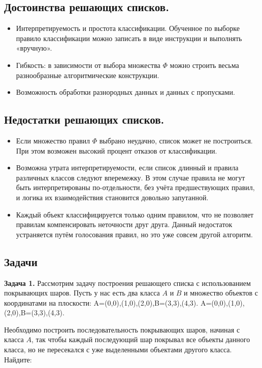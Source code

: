 \subsection*{Достоинства решающих списков.}

\begin{itemize} \item Интерпретируемость и простота классификации. Обученное по выборке правило классификации можно записать в виде инструкции и выполнять «вручную». \item Гибкость: в зависимости от выбора множества $\Phi$ можно строить весьма разнообразные алгоритмические конструкции. \item Возможность обработки разнородных данных и данных с пропусками. \end{itemize}

\subsection*{Недостатки решающих списков.}

\begin{itemize} \item Если множество правил $\Phi$ выбрано неудачно, список может не построиться. При этом возможен высокий процент отказов от классификации. \item Возможна утрата интерпретируемости, если список длинный и правила различных классов следуют вперемежку. В этом случае правила не могут быть интерпретированы по-отдельности, без учёта предшествующих правил, и логика их взаимодействия становится довольно запутанной. \item Каждый объект классифицируется только одним правилом, что не позволяет правилам компенсировать неточности друг друга. Данный недостаток устраняется путём голосования правил, но это уже совсем другой алгоритм. \end{itemize}

\subsection*{Задачи}

\textbf{Задача 1.} Рассмотрим задачу построения решающего списка с использованием покрывающих шаров. Пусть у нас есть два класса $A$ и $B$ и множество объектов с координатами на плоскости:
A={(0,0),(1,0),(2,0)},B={(3,3),(4,3)}.
A={(0,0),(1,0),(2,0)},B={(3,3),(4,3)}.

Необходимо построить последовательность покрывающих шаров, начиная с класса $A$, так чтобы каждый последующий шар покрывал все объекты данного класса, но не пересекался с уже выделенными объектами другого класса. Найдите:

